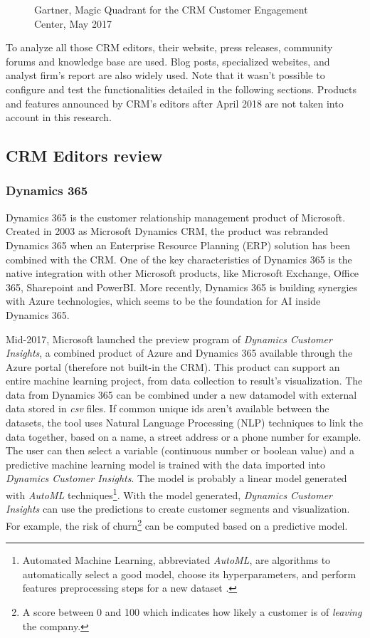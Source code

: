 \begin{figure}[!h]
\begin{minipage}[c]{0.49\linewidth}
        \caption[Magic Quadrant for the CRM Customer Engagement Center]{Gartner, Magic Quadrant for the CRM Customer Engagement Center, May 2017}
        \label{fig:magic-quadrant-customer-engagement}
    \end{minipage}
\end{figure}

To analyze all those CRM editors, their website, press releases, community forums and knowledge base are used. Blog posts, specialized websites, and analyst firm's report are also widely used. Note that it wasn't possible to configure and test the functionalities detailed in the following sections. Products and features announced by CRM's editors after April 2018 are not taken into account in this research.

\subsection{CRM Editors review}

\subsubsection*{Dynamics 365}
Dynamics 365 is the customer relationship management product of Microsoft. Created in 2003 as Microsoft Dynamics CRM, the product was rebranded Dynamics 365 when an Enterprise Resource Planning (ERP) solution has been combined with the CRM. One of the key characteristics of Dynamics 365 is the native integration with other Microsoft products, like Microsoft Exchange, Office 365, Sharepoint and PowerBI. More recently, Dynamics 365 is building synergies with Azure technologies, which seems to be the foundation for AI inside Dynamics 365. 

Mid-2017, Microsoft launched the preview program of \textit{Dynamics Customer Insights}, a combined product of Azure and Dynamics 365 available through the Azure portal (therefore not built-in the CRM). This product can support an entire machine learning project, from data collection to result's visualization. The data from Dynamics 365 can be combined under a new datamodel with external data stored in \textit{csv} files. If common unique ids aren't available between the datasets, the tool uses Natural Language Processing (NLP) techniques to link the data together, based on a name, a street address or a phone number for example. The user can then select a variable (continuous number or boolean value) and a predictive machine learning model is trained with the data imported into \textit{Dynamics Customer Insights}. The model is probably a linear model generated with \textit{AutoML} techniques\footnote{Automated Machine Learning, abbreviated \textit{AutoML}, are algorithms to automatically select a good model, choose its hyperparameters, and perform features preprocessing steps for a new dataset \cite{NIPS2015_5872}.}. With the model generated, \textit{Dynamics Customer Insights} can use the predictions to create customer segments and visualization. For example, the risk of churn\footnote{A score between 0 and 100 which indicates how likely a customer is of \textit{leaving} the company.} can be computed based on a predictive model.

